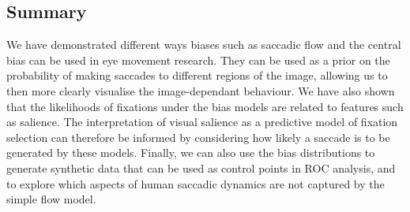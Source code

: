 \subsection{Summary}

We have demonstrated different ways biases such as saccadic flow and the central bias can be used in eye movement research. They can be used as a prior on the probability of making saccades to different regions of the image, allowing us to then more clearly visualise the image-dependant behaviour. We have also shown that the likelihoods of fixations under the bias models are related to features such as salience. The interpretation of visual salience as a predictive model of fixation selection can therefore be informed by considering how likely a saccade is to be generated by these models. Finally, we can also use the bias distributions to generate synthetic data that can be used as control points in ROC analysis, and to explore which aspects of human saccadic dynamics are not captured by the simple flow model. 
